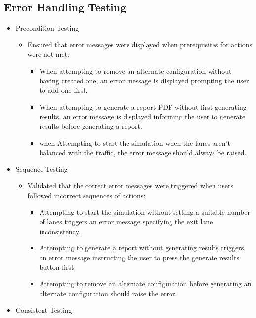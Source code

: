 \documentclass{article}
\begin{document}
    \subsection{Error Handling Testing}
    \begin{itemize}
        \item Precondition Testing
        \begin{itemize}
            \item Ensured that error messages were displayed when prerequisites for actions were not met:
            \begin{itemize}
                \item When attempting to remove an alternate configuration without having created one, an error message is displayed prompting the user to add one first.
                \item When attempting to generate a report PDF without first generating results, an error message is displayed informing the user to generate results before generating a report.
                \item when Attempting to start the simulation when the lanes aren't balanced with the traffic, the error message should always be raised.
            \end{itemize}
        \end{itemize}
        \item Sequence Testing
        \begin{itemize}
            \item Validated that the correct error messages were triggered when users followed incorrect sequences of actions:
            \begin{itemize}
                \item Attempting to start the simulation without setting a suitable number of lanes triggers an error message specifying the exit lane inconsistency.
                \item Attempting to generate a report without generating results triggers an error message instructing the user to press the generate results button first.
                \item Attempting to remove an alternate configuration before generating an alternate configuration should raise the error.
            \end{itemize}
        \end{itemize}
        \item Consistent Testing
        \begin{itemize}

\end{itemize}
\end{itemize}
\end{document}
